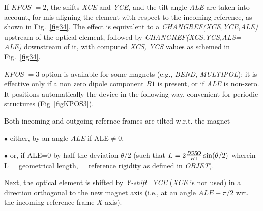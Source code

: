 \noindent If  \textsl{KPOS} $=2 $, the shifts   \textsl{XCE}   
and   \textsl{YCE}, and the tilt angle \textsl{ALE}   are taken into 
account, for mis-aligning  the element with respect to the incoming 
reference, as shown in Fig.~\ref{fig34}.  
The effect is equivalent to  a \textsl{CHANGREF(XCE,YCE,ALE)}  upstream of the 
optical element, followed by   \textsl{CHANGREF(XCS,YCS,ALS=-ALE)} downstream of it, with 
 computed \textsl{XCS, YCS} values as schemed in Fig.~\ref{fig34}.  

\noindent \textsl{KPOS} $=3 $ option is available for some 
 magnets  (e.g., \textsl{BEND}, \textsl{MULTIPOL}); 
it is effective only if a non zero dipole component $B1$ is present, or if  \textsl{ALE} is non-zero. 
It positions automatically the 
device in the  following way, convenient for periodic structures (Fig~\ref{figKPOS3}).
 
Both incoming and outgoing refernce frames are  tilted w.r.t. the magnet 

 $\bullet$ either,  by an angle \textsl{ALE}  if ALE$\not =$0, 

 $\bullet$ or, if ALE=0  by  half the deviation $\theta/2$ (such that $ L = 
2 \frac{B\!O\!R\!O}{B1} \sin({\theta}/{2})$ wherein L = geometrical length, 
\BORO  = reference rigidity as defined in \textsl{OBJET}).

\noindent Next, the optical element is  shifted by \textsl{Y-shift=YCE} (\textsl{XCE} is not used) in a 
direction orthogonal to the new magnet axis (i.e., at an angle $ALE+\pi/2$ wrt. the incoming 
reference frame $X$-axis). 


\vfill

